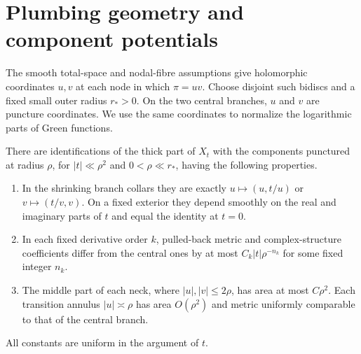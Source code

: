 \section{Plumbing geometry and component potentials}\label{sec:plumbing}

The smooth total-space and nodal-fibre assumptions give holomorphic
coordinates $u,v$ at each node in which $\pi=uv$. Choose disjoint
such bidiscs and a fixed small outer radius $r_*>0$. On the two
central branches, $u$ and $v$ are puncture coordinates. We use the
same coordinates to normalize the logarithmic parts of Green functions.

\begin{lemma}\label{lem:plumbing}
There are identifications of the thick part of $X_t$ with the
components punctured at radius $\rho$, for $|t|\ll\rho^2$ and
$0<\rho\ll r_*$, having the following properties.
\begin{enumerate}
\item In the shrinking branch collars they are exactly
$u\mapsto(u,t/u)$ or $v\mapsto(t/v,v)$. On a fixed exterior they
depend smoothly on the real and imaginary parts of $t$ and equal
the identity at $t=0$.
\item In each fixed derivative order $k$, pulled-back metric and
complex-structure coefficients differ from the central ones by at
most $C_k|t|\rho^{-n_k}$ for some fixed integer $n_k$.
\item The middle part of each neck, where $|u|,|v|\le2\rho$, has
area at most $C\rho^2$. Each transition annulus $|u|\asymp\rho$
has area $O(\rho^2)$ and metric uniformly comparable to that of the
central branch.
\end{enumerate}
All constants are uniform in the argument of $t$.
\end{lemma}
